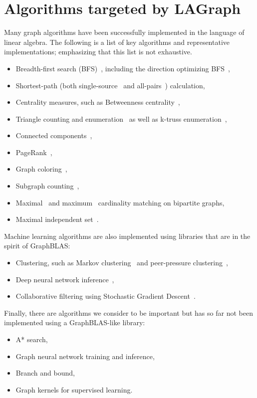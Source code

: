 \section{Algorithms targeted by LAGraph}
\label{sec:algorithms}

Many graph algorithms have been successfully implemented in the language of linear algebra. The following is
a list of key algorithms and representative implementations; emphasizing that this list is not 
exhaustive. 

\begin{itemize}
\item Breadth-first search (BFS)~\cite{bulucc2011parallel, gbtl-cuda16, Davis19}, including the direction optimizing BFS~\cite{Yang:2018:IPE},
\item Shortest-path (both single-source~\cite{Yang:2019:GBL, ssspgrapl19, gbtl-cuda16} and all-pairs~\cite{ca_apsp}) calculation,
\item Centrality measures, such as Betweenness centrality~\cite{combblas},
\item Triangle counting and enumeration~\cite{trianglegabb15, wang2016comparative} as well as k-truss enumeration~\cite{davis2018graph,low2018linear},
\item Connected components~\cite{lacc2019},
\item PageRank~\cite{satish2014navigating},
\item Graph coloring~\cite{coloringgrapl19},
\item Subgraph counting~\cite{chen2019graphblas},
\item Maximal~\cite{parco16} and maximum~\cite{matchingipdps16} cardinality matching on bipartite graphs,
\item Maximal independent set~\cite{jpdc15, Yang:2019:GBL}.
\end{itemize}

Machine learning algorithms are also implemented using libraries that are in the spirit of GraphBLAS:
\begin{itemize}
\item Clustering, such as Markov clustering~\cite{azad2018hipmcl} and peer-pressure clustering~\cite{gilbert2006high},
\item Deep neural network inference~\cite{kepner2017enabling},
\item Collaborative filtering using Stochastic Gradient Descent~\cite{satish2014navigating}.
\end{itemize}

Finally, there are algorithms we consider to be important but has so far not been implemented using a GraphBLAS-like library:
\begin{itemize}
\item A* search,
\item Graph neural network training and inference,
\item Branch and bound,
\item Graph kernels for supervised learning.
\end{itemize}
